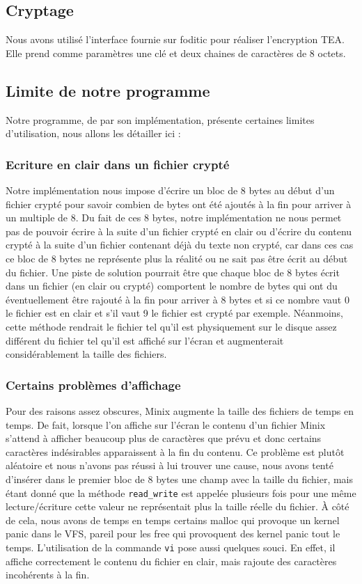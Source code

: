 \documentclass[10pt, onecolumn] {IEEEtran}
\begin{document}
\subsection{Cryptage}

Nous avons utilisé l'interface fournie sur foditic pour réaliser l'encryption TEA. Elle prend comme paramètres une clé et deux chaines de caractères de 8 octets.

\subsection{Limite de notre programme}

Notre programme, de par son implémentation, présente certaines limites d'utilisation, nous allons les détailler ici :
\subsubsection{Ecriture en clair dans un fichier crypté}

Notre implémentation nous impose d'écrire un bloc de 8 bytes au début d'un fichier crypté pour savoir combien de bytes ont été ajoutés à la fin pour arriver à un multiple de 8. Du fait de ces 8 bytes, notre implémentation ne nous permet pas de pouvoir écrire à la suite d'un fichier crypté en clair ou d'écrire du contenu crypté à la suite d'un fichier contenant déjà du texte non crypté, car dans ces cas ce bloc de 8 bytes ne représente plus la réalité ou ne sait pas être écrit au début du fichier.
Une piste de solution pourrait être que chaque bloc de 8 bytes écrit dans un fichier (en clair ou crypté) comportent le nombre de bytes qui ont du éventuellement être rajouté à la fin pour arriver à 8 bytes et si ce nombre vaut 0 le fichier est en clair et s'il vaut 9 le fichier est crypté par exemple. Néanmoins, cette méthode rendrait le fichier tel qu'il est physiquement sur le disque assez différent du fichier tel qu'il est affiché sur l'écran et augmenterait considérablement la taille des fichiers.
\subsubsection{Certains problèmes d'affichage}

Pour des raisons assez obscures, Minix augmente la taille des fichiers de temps en temps. De fait, lorsque l'on affiche sur l'écran le contenu d'un fichier Minix s'attend à afficher beaucoup plus de caractères que prévu et donc certains caractères indésirables apparaissent à la fin du contenu. Ce problème est plutôt aléatoire et nous n'avons pas réussi à lui trouver une cause, nous avons tenté d'insérer dans le premier bloc de 8 bytes une champ avec la taille du fichier, mais étant donné que la méthode \texttt{read\_write} est appelée plusieurs fois pour une même lecture/écriture cette valeur ne représentait plus la taille réelle du fichier.
À côté de cela, nous avons de temps en temps certains malloc qui provoque un kernel panic dans le VFS, pareil pour les free qui provoquent des kernel panic tout le temps.
L'utilisation de la commande \texttt{vi} pose aussi quelques souci. En effet, il affiche correctement le contenu du fichier en clair, mais rajoute des caractères incohérents à la fin.
\end{document}
